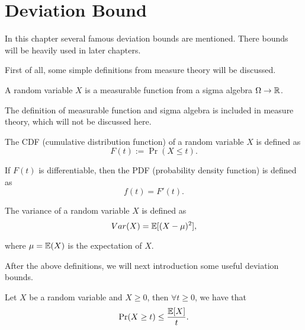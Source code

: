 \documentclass[../main.tex]{subfiles}
\begin{document}
\chapter{Deviation Bound}
In this chapter several famous deviation bounds are mentioned. There bounds will be heavily used in later chapters.

First of all, some simple definitions from measure theory will be discussed.

\begin{definition}
	A random variable $X$ is a measurable function from a sigma algebra $\Omega \to \mathbb{R}$.
\end{definition}

The definition of measurable function and sigma algebra is included in measure theory, which will not be discussed here.

\begin{definition}
	The CDF (cumulative distribution function) of a random variable $X$ is defined as 
	\begin{equation}
		F(t) := \Pr(X \leq t).
	\end{equation}
\end{definition}

\begin{definition}
	If $F(t)$ is differentiable, then the PDF (probability density function) is defined as 
	\begin{equation}
		f(t) = F'(t).
	\end{equation}
\end{definition}

\begin{definition}
	The variance of a random variable $X$ is defined as 
	\begin{equation}
	Var(X) = \mathbb{E}[(X - \mu)^2],
	\end{equation}
	
	where $\mu = \mathbb{E}(X)$ is the expectation of $X$.
\end{definition}

After the above definitions, we will next introduction some useful deviation bounds.

\begin{theorem}
	Let $X$ be a random variable and $X \geq 0$, then $\forall t \geq 0$, we have that 
	\begin{equation}
		\Pr(X \geq t)\leq \frac{\mathbb{E}[X]}{t}.
	\end{equation}
\end{theorem}
\end{document}
